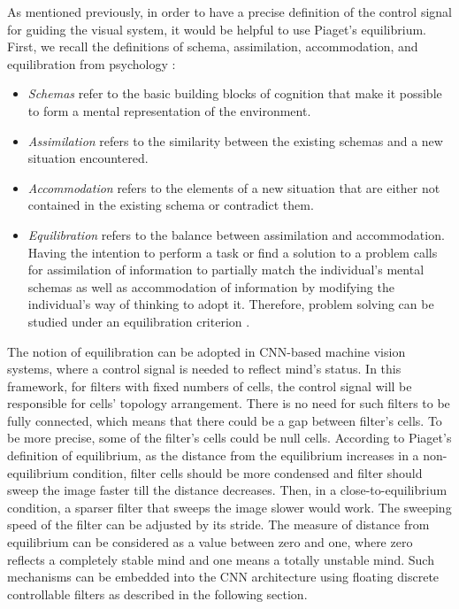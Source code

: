 \documentclass[journal]{IEEEtran}
\begin{document}
As mentioned previously, in order to have a precise definition of the control signal for guiding the visual system, it would be helpful to use Piaget's equilibrium. First, we recall the definitions of schema, assimilation, accommodation, and equilibration from psychology \cite{piaget2008psychology}:
\begin{itemize}
\item 	\textit{Schemas} refer to the basic building blocks of cognition that make it possible to form a mental representation of the environment. 
\item 	\textit{Assimilation} refers to the similarity between the existing schemas and a new situation encountered. 
\item 	\textit{Accommodation} refers to the elements of a new situation that are either not contained in the existing schema or contradict them.
\item 	\textit{Equilibration} refers to the balance between assimilation and accommodation. Having the intention to perform a task or find a solution to a problem calls for assimilation of information to partially match the individual's mental schemas as well as accommodation of information by modifying the individual's way of thinking to adopt it. Therefore, problem solving can be studied under an equilibration criterion \cite{singer1997piaget}.  
\end{itemize}

The notion of equilibration can be adopted in CNN-based machine vision systems, where a control signal is needed to reflect mind's status. In this framework, for filters with fixed numbers of cells, the control signal will be responsible for cells' topology arrangement. There is no need for such filters to be fully connected, which means that there could be a gap between filter's cells. To be more precise, some of the filter's cells could be null cells. According to Piaget's definition of equilibrium, as the distance from the equilibrium increases in a non-equilibrium condition, filter cells should be more condensed and filter should sweep the image faster till the distance decreases. Then, in a close-to-equilibrium condition, a sparser filter that sweeps the image slower would work. The sweeping speed of the filter can be adjusted by its stride. The measure of distance from equilibrium can be considered as a value between zero and one, where zero reflects a completely stable mind and one means a totally unstable mind. Such mechanisms can be embedded into the CNN architecture using floating discrete controllable filters as described in the following section.
\end{document}
